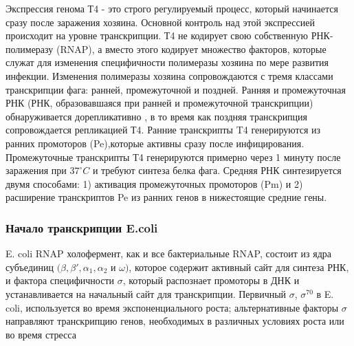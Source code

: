 \documentclass[14pt]{extarticle}
\begin{document}
        \par{Экспрессия генома Т4 - это строго регулируемый процесс, который начинается сразу после заражения хозяина. 
        Основной контроль над этой экспрессией происходит на уровне транскрипции. Т4 не кодирует свою собственную 
        РНК-полимеразу (RNAP), а вместо этого кодирует множество факторов, которые служат для изменения специфичности 
        полимеразы хозяина по мере развития инфекции. Изменения полимеразы хозяина сопровождаются с тремя классами 
        транскрипции фага: ранней, промежуточной и поздней. Ранняя и промежуточная РНК (РНК, образовавшаяся при ранней и
        промежуточной транскрипции) обнаруживается дорепликативно 
        \cite{hinton1,hinton2}, в то время как поздняя транскрипция сопровождается 
        репликацией Т4. Ранние транскрипты T4 генерируются из ранних промоторов 
        (Pe),которые активны сразу после инфицирования. Промежуточные транскрипты Т4 генерируются примерно через 1 
        минуту после заражения при \(37^\circ C\) и требуют синтеза белка фага. Средняя РНК синтезируется двумя 
        способами: 1) активация промежуточных промоторов (Pm) и 2) расширение транскриптов Pe из ранних генов в 
        нижестоящие средние гены.}
        
        \begin{center}
        \item \subsubsection {Начало транскрипции E.coli}
        \end{center}
        
        \par{E. coli RNAP холофермент, как и все бактериальные RNAP, состоит из ядра субъединиц 
        \((\beta,\beta',\alpha_1,\alpha_2\) и \(\omega)\), которое содержит активный сайт для синтеза РНК, и фактора 
        специфичности \(\sigma\), который распознает промоторы в ДНК и устанавливается на начальный сайт для 
        транскрипции. Первичный \(\sigma\), \(\sigma^{70}\) в E. coli, используется во время экспоненциального роста; 
        альтернативные факторы \(\sigma\) направляют транскрипцию генов, необходимых в различных условиях роста или во 
        время стресса \cite{17}}
        
\end{document}
